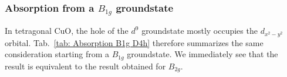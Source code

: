 \documentclass[twocolumn,prb,twocolumn,amsmath,superscriptaddress,nofootinbib,amssymb]{revtex4-1}
\begin{document}
\begin{widetext}
\subsubsection{Absorption from a $B_{1g}$ groundstate}

\begin{table*}[htbp]
\caption{\label{tab: Absorption B1g D4h} Symmetry selectivity in the excitation process from a $B_{1g}$ ground state in $D_{4h}$ symmetry. The use of this table is explained in detail in the caption of Tab.~\ref{tab: Emission A1g D4h}.}
\end{table*}

In tetragonal CuO, the hole of the $d^9$ groundstate mostly occupies the $d_{x^2-y^2}$ orbital. Tab.~\ref{tab: Absorption B1g D4h} therefore summarizes the same consideration starting from a $B_{1g}$ groundstate. We immediately see that the result is equivalent to the result obtained for $B_{2g}$.


\end{widetext}
\end{document}
